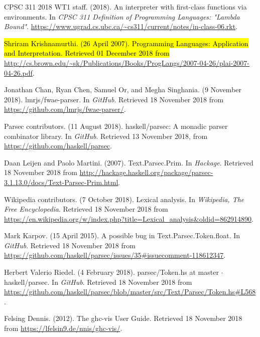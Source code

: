 \documentclass[format=acmlarge, review=false, nonacm=false, screen=true]{acmart}
\begin{document}
\begin{thebibliography}{99}

    CPSC 311 2018 WT1 staff.
    (2018).
    An interpreter with first-class functions via environments.
    In \textit{CPSC 311 Definition of Programming Languages: "Lambda Bound"}.
      \url{https://www.ugrad.cs.ubc.ca/~cs311/current/notes/in-class-06.rkt}.

    \hl{
    Shriram Krishnamurthi.
    (26 April 2007).
    Programming Languages: Application and Interpretation.
    Retrieved 01 December 2018 from} \url{http://cs.brown.edu/~sk/Publications/Books/ProgLangs/2007-04-26/plai-2007-04-26.pdf}.

    Jonathan Chan, Ryan Chen, Samuel Or, and Megha Singhania.
    (9 November 2018).
    lmrjs/fwae-parser.
    In \textit{GitHub}.
    Retrieved 18 November 2018 from \url{https://github.com/lmrjs/fwae-parser/}.

    Parsec contributors.
    (11 August 2018).
    haskell/parsec: A monadic parser combinator library.
    In \textit{GitHub}.
    Retrieved 13 November 2018, from \url{https://github.com/haskell/parsec}.
  
    Daan Leijen and Paolo Martini.
    (2007).
    Text.Parsec.Prim.
    In \textit{Hackage}.
    Retrieved 18 November 2018 from \url{http://hackage.haskell.org/package/parsec-3.1.13.0/docs/Text-Parsec-Prim.html}.

    Wikipedia contributors.
    (7 October 2018).
    Lexical analysis.
    In \textit{Wikipedia, The Free Encyclopedia}.
    Retrieved 18 November 2018 from \url{https://en.wikipedia.org/w/index.php?title=Lexical_analysis&oldid=862914890}.
    
    Mark Karpov.
    (15 April 2015).
    A possible bug in Text.Parsec.Token.float.
    In \textit{GitHub}.
    Retrieved 18 November 2018 from \url{https://github.com/haskell/parsec/issues/35#issuecomment-118612347}.
    
    Herbert Valerio Riedel.
    (4 February 2018).
    parsec/Token.hs at master $\cdot$ haskell/parsec.
    In \textit{GitHub}.
    Retrieved 18 November 2018 from \url{https://github.com/haskell/parsec/blob/master/src/Text/Parsec/Token.hs#L568}.
    
    Felsing Dennis.
    (2012).
    The ghc-vis User Guide. 
    Retrieved 18 November 2018 from
      \url{https://lfelsin9.de/nnis/ghc-vis/}.
  

\end{thebibliography}
\end{document}
